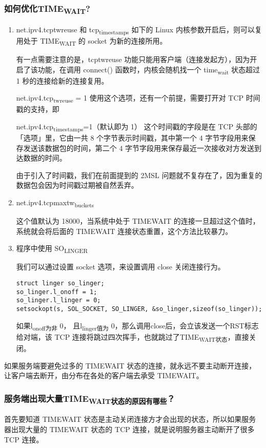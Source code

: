 \documentclass[11pt]{article}
\begin{document}
\subsubsection{如何优化TIME\textsubscript{WAIT}?}
\label{sec:orge619acf}
\begin{enumerate}
\item net.ipv4.tcptwreuse 和 tcp\textsubscript{timestamps}
如下的 Linux 内核参数开启后，则可以复用处于 TIME\textsubscript{WAIT} 的 socket 为新的连接所用。

有一点需要注意的是，tcptwreuse 功能只能用客户端（连接发起方），因为开启了该功能，在调用 connect() 函数时，内核会随机找一个 time\textsubscript{wait} 状态超过 1 秒的连接给新的连接复用。

net.ipv4.tcp\textsubscript{tw}\textsubscript{reuse} = 1
使用这个选项，还有一个前提，需要打开对 TCP 时间戳的支持，即

net.ipv4.tcp\textsubscript{timestamps}=1（默认即为 1）
这个时间戳的字段是在 TCP 头部的「选项」里，它由一共 8 个字节表示时间戳，其中第一个 4 字节字段用来保存发送该数据包的时间，第二个 4 字节字段用来保存最近一次接收对方发送到达数据的时间。

由于引入了时间戳，我们在前面提到的 2MSL 问题就不复存在了，因为重复的数据包会因为时间戳过期被自然丢弃。

\item net.ipv4.tcpmaxtw\textsubscript{buckets}

这个值默认为 18000，当系统中处于 TIMEWAIT 的连接一旦超过这个值时，系统就会将后面的 TIMEWAIT 连接状态重置，这个方法比较暴力。

\item 程序中使用 SO\textsubscript{LINGER}

我们可以通过设置 socket 选项，来设置调用 close 关闭连接行为。
\begin{verbatim}
struct linger so_linger;
so_linger.l_onoff = 1;
so_linger.l_linger = 0;
setsockopt(s, SOL_SOCKET, SO_LINGER, &so_linger,sizeof(so_linger));
\end{verbatim}
如果l\textsubscript{onoff为非} 0， 且l\textsubscript{linger值为} 0，那么调用close后，会立该发送一个RST标志给对端，该 TCP 连接将跳过四次挥手，也就跳过了TIME\textsubscript{WAIT状态}，直接关闭。
\end{enumerate}


如果服务端要避免过多的 TIMEWAIT 状态的连接，就永远不要主动断开连接，让客户端去断开，由分布在各处的客户端去承受 TIMEWAIT。
\subsubsection{服务端出现大量TIME\textsubscript{WAIT状态的原因有哪些}？}
\label{sec:orgfd526d6}
首先要知道 TIMEWAIT 状态是主动关闭连接方才会出现的状态，所以如果服务器出现大量的 TIMEWAIT 状态的 TCP 连接，就是说明服务器主动断开了很多 TCP 连接。
\end{document}
